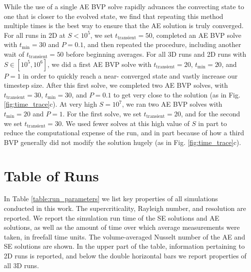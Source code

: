 \documentclass[aps, pre, onecolumn, nofootinbib, notitlepage, groupedaddress, amsfonts, amssymb, amsmath, longbibliography]{revtex4-1}
\begin{document}
While the use of a single AE BVP solve rapidly advances the convecting state to
one that is closer to the evolved state, we find that repeating this method 
multiple times is the best way to
ensure that the AE solution is truly converged. For all runs in 2D at $S < 10^5$, we
set $t_{\text{transient}} = 50$, completed an AE BVP solve
with $t_{\text{min}} = 30$ and $P = 0.1$, and then repeated the procedure,
including another wait of $t_{\text{transient}} = 50$ before beginning averages.
For all 3D runs and 2D runs with $S \in [10^5, 10^6]$,
we did a first AE BVP solve with $t_{\text{transient}} = 20$,
$t_{\text{min}} = 20$, and $P = 1$ in order to quickly reach a near-
converged state and vastly increase our timestep size.  After this first solve, 
we completed two AE BVP solves, with $t_{\text{transient}} = 30$,
$t_{\text{min}} = 30$, 
and $P = 0.1$ to get very close to the solution (as in Fig. \ref{fig:time_trace}c).
At very high $S = 10^7$, we ran two AE BVP solves with $t_{\text{min}} = 20$ and
$P = 1$. For the first solve, we set $t_{\text{transient}} = 20$, and for the
second we set $t_{\text{transient}} = 30$. We used fewer solves at this high
value of $S$ in part to reduce the computational expense of the run, and in
part because of how a third BVP generally did not modify the solution hugely
(as in Fig. \ref{fig:time_trace}c).




\section{Table of Runs}
\label{appendix:run_table}
In Table \ref{table:run_parameters} we list key properties of all simulations
conducted in this work.  The supercriticality, Rayleigh number, and resolution
are reported.  We report the simulation run time of the SE solutions and AE
solutions, as well as the amount of time over which average measurements
were taken, in freefall time units.  The volume-averaged Nusselt number of the
AE and SE solutions are shown.
In the upper part of the table, information pertaining to 2D runs is reported,
and below the double horizontal bars we report properties of all
3D runs.
\end{document}

